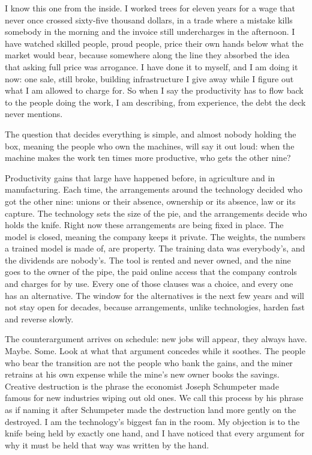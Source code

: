 \documentclass[11pt]{article}
\begin{document}
I know this one from the inside. I worked trees for eleven years for a wage that never once crossed sixty-five thousand dollars, in a trade where a mistake kills somebody in the morning and the invoice still undercharges in the afternoon. I have watched skilled people, proud people, price their own hands below what the market would bear, because somewhere along the line they absorbed the idea that asking full price was arrogance. I have done it to myself, and I am doing it now: one sale, still broke, building infrastructure I give away while I figure out what I am allowed to charge for. So when I say the productivity has to flow back to the people doing the work, I am describing, from experience, the debt the deck never mentions.

The question that decides everything is simple, and almost nobody holding the box, meaning the people who own the machines, will say it out loud: when the machine makes the work ten times more productive, who gets the other nine?

Productivity gains that large have happened before, in agriculture and in manufacturing. Each time, the arrangements around the technology decided who got the other nine: unions or their absence, ownership or its absence, law or its capture. The technology sets the size of the pie, and the arrangements decide who holds the knife. Right now these arrangements are being fixed in place. The model is closed, meaning the company keeps it private. The weights, the numbers a trained model is made of, are property. The training data was everybody's, and the dividends are nobody's. The tool is rented and never owned, and the nine goes to the owner of the pipe, the paid online access that the company controls and charges for by use. Every one of those clauses was a choice, and every one has an alternative. The window for the alternatives is the next few years and will not stay open for decades, because arrangements, unlike technologies, harden fast and reverse slowly.

The counterargument arrives on schedule: new jobs will appear, they always have. Maybe. Some. Look at what that argument concedes while it soothes. The people who bear the transition are not the people who bank the gains, and the miner retrains at his own expense while the mine's new owner books the savings. Creative destruction is the phrase the economist Joseph Schumpeter made famous for new industries wiping out old ones. We call this process by his phrase as if naming it after Schumpeter made the destruction land more gently on the destroyed. I am the technology's biggest fan in the room. My objection is to the knife being held by exactly one hand, and I have noticed that every argument for why it must be held that way was written by the hand.
\end{document}
